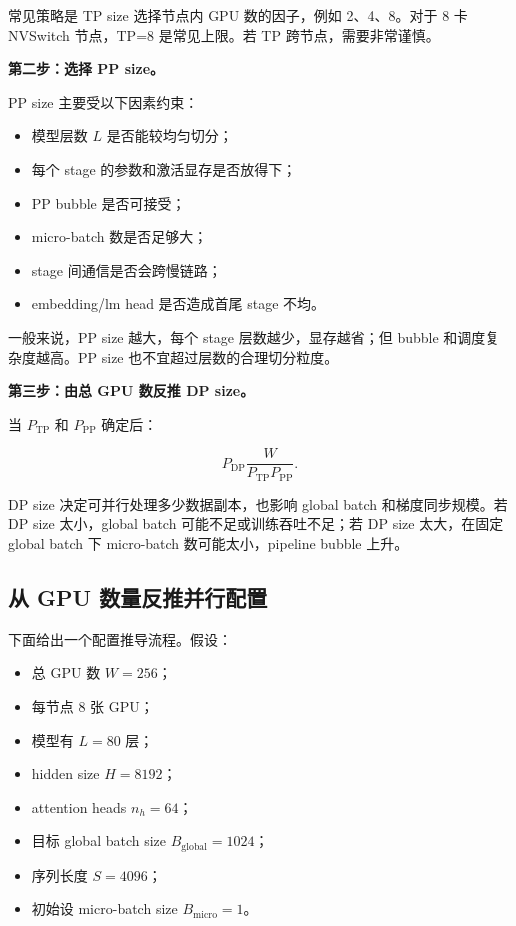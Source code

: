 常见策略是 TP size 选择节点内 GPU 数的因子，例如 2、4、8。对于 8 卡 NVSwitch 节点，TP=8 是常见上限。若 TP 跨节点，需要非常谨慎。

\textbf{第二步：选择 PP size。}

PP size 主要受以下因素约束：

\begin{itemize}
\item 模型层数 $L$ 是否能较均匀切分；
\item 每个 stage 的参数和激活显存是否放得下；
\item PP bubble 是否可接受；
\item micro-batch 数是否足够大；
\item stage 间通信是否会跨慢链路；
\item embedding/lm head 是否造成首尾 stage 不均。
\end{itemize}

一般来说，PP size 越大，每个 stage 层数越少，显存越省；但 bubble 和调度复杂度越高。PP size 也不宜超过层数的合理切分粒度。

\textbf{第三步：由总 GPU 数反推 DP size。}

当 $P_{\mathrm{TP}}$ 和 $P_{\mathrm{PP}}$ 确定后：

\[
P_{\mathrm{DP}}
\frac{W}{P_{\mathrm{TP}}P_{\mathrm{PP}}}.
\]

DP size 决定可并行处理多少数据副本，也影响 global batch 和梯度同步规模。若 DP size 太小，global batch 可能不足或训练吞吐不足；若 DP size 太大，在固定 global batch 下 micro-batch 数可能太小，pipeline bubble 上升。

\subsection{从 GPU 数量反推并行配置}
\label{subsec:derive-parallel-config-from-gpu-count}

下面给出一个配置推导流程。假设：

\begin{itemize}
\item 总 GPU 数 $W=256$；
\item 每节点 8 张 GPU；
\item 模型有 $L=80$ 层；
\item hidden size $H=8192$；
\item attention heads $n_h=64$；
\item 目标 global batch size $B_{\mathrm{global}}=1024$；
\item 序列长度 $S=4096$；
\item 初始设 micro-batch size $B_{\mathrm{micro}}=1$。
\end{itemize}

